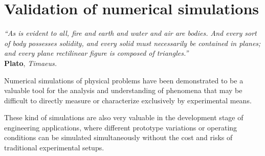 \chapter{Validation of numerical simulations}
\label{cap:cfd}

\null\vspace{-10mm}
\begin{flushright}
\begin{minipage}[t]{0.66\textwidth}
{\itshape\small``As is evident to all, fire and earth and water and air are bodies. And every sort of body possesses solidity, and every solid must necessarily be contained in planes; and every plane rectilinear figure is composed of triangles.''}\\[-3mm]

{\cabincondensed\small\hfill \textbf{Plato}, \emph{Timaeus.}}\\[5mm]
\end{minipage}
\end{flushright}


\noindent Numerical simulations of physical problems have been demonstrated to be a valuable tool for the analysis and understanding of phenomena that may be difficult to directly measure or characterize exclusively by experimental means.

These kind of simulations are also very valuable in the development stage of engineering applications, where different prototype variations or operating conditions can be simulated simultaneously without the cost and risks of traditional experimental setups. 

